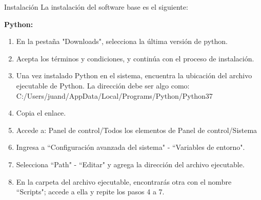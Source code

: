 \begin{frame}[t]{Instalación}\vspace{5pt}
La instalación del software base es el siguiente:

\textbf{Python:}

\begin{enumerate}
	\item En la pestaña "Downloads", selecciona la última versión de python. 
	\item Acepta los términos y condiciones, y continúa con el proceso de instalación.
	\item Una vez instalado Python en el sistema, encuentra la ubicación del archivo ejecutable de Python. La dirección debe ser algo como: C:/Users/juand/AppData/Local/Programs/Python/Python37
	\item Copia el enlace.
	\item Accede a: Panel de control/Todos los elementos de Panel de control/Sistema
	\item Ingresa a ``Configuración avanzada del sistema" - ``Variables de entorno".
	\item Selecciona ``Path" - ``Editar" y agrega la dirección del archivo ejecutable.
	\item En la carpeta del archivo ejecutable, encontrarás otra con el nombre ``Scripts"; accede a ella y repite los pasos 4 a 7.
\end{enumerate}

\end{frame}